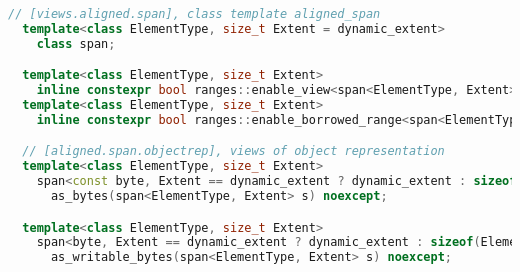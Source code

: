 \documentclass[11pt]{article}
\begin{document}
\begin{lstlisting}[language=C++, basicstyle=\small]
// [views.aligned.span], class template aligned_span
  template<class ElementType, size_t Extent = dynamic_extent>
    class span;

  template<class ElementType, size_t Extent>
    inline constexpr bool ranges::enable_view<span<ElementType, Extent>> = true;
  template<class ElementType, size_t Extent>
    inline constexpr bool ranges::enable_borrowed_range<span<ElementType, Extent>> = true;

  // [aligned.span.objectrep], views of object representation
  template<class ElementType, size_t Extent>
    span<const byte, Extent == dynamic_extent ? dynamic_extent : sizeof(ElementType) * Extent>
      as_bytes(span<ElementType, Extent> s) noexcept;

  template<class ElementType, size_t Extent>
    span<byte, Extent == dynamic_extent ? dynamic_extent : sizeof(ElementType) * Extent>
      as_writable_bytes(span<ElementType, Extent> s) noexcept;
\end{lstlisting}
\end{document}
